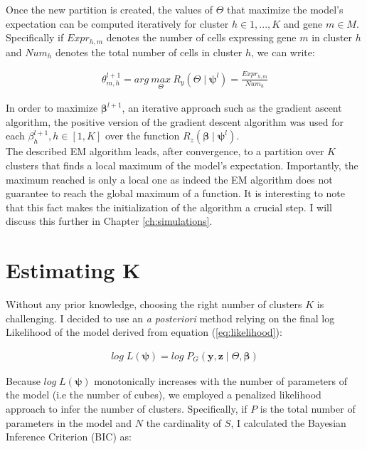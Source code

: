 Once the new partition is created, the values of $\Theta$ that maximize the model's expectation can be computed iteratively for cluster $h \in {1,...,K}$ and gene $m \in M$. Specifically if $Expr_{h,m}$ denotes the number of cells expressing gene $m$ in cluster $h$ and $Num_h$ denotes the total number of cells in cluster $h$, we can write:

\begin{align*}
\theta_{m,h}^{l+1} = arg\:\underset{\Theta}{max}\:R_y(\Theta\mid \boldsymbol{\psi}^l) = \frac{Expr_{h,m}}{Num_h}
\end{align*}

In order to maximize $\boldsymbol{\beta}^{l+1}$, an iterative approach such as the gradient ascent algorithm, the positive version of the gradient descent algorithm \cite{burges2005} was used for each $\beta_h^{l+1}, h \in [1,K]$ over the function $R_z(\boldsymbol{\beta}\mid \boldsymbol{\psi}^l)$. \\



The described EM algorithm leads, after convergence, to a partition over $K$ clusters that finds a local maximum of the model's expectation. Importantly, the maximum reached is only a local one as indeed the EM algorithm does not guarantee to reach the global maximum of a function. It is interesting to note that this fact makes the initialization of the algorithm a crucial step. I will discuss this further in Chapter \ref{ch:simulations}.\\


\section{Estimating K}
Without any prior knowledge, choosing the right number of clusters $K$ is challenging. I decided to use an {\it{a posteriori}} method relying on the final log Likelihood of the model derived from equation (\ref{eq:likelihood}):

\begin{align*}
log\;L(\boldsymbol{\psi}) = 	log\;P_G(\boldsymbol{y},\boldsymbol{z} \mid \Theta, \boldsymbol{\beta})
\end{align*}

Because $log\;L(\boldsymbol{\psi})$ monotonically increases with the number of parameters of the model (i.e the number of cubes), we employed a penalized likelihood approach to infer the number of clusters. Specifically, if $P$ is the total number of parameters in the model and $N$ the cardinality of $S$, I calculated the Bayesian Inference Criterion (BIC) \cite{burnham04} as:

